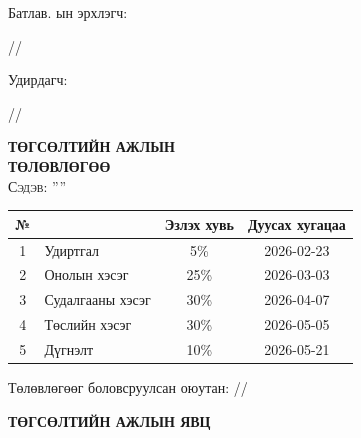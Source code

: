 
\begin{titlepage}

\vspace*{0.5cm}
Батлав. \deptname ын эрхлэгч: 
\begin{flushright}
\makebox[4cm]{\dotfill} /\chairname/ 
\end{flushright}

Удирдагч: 
\begin{flushright}
\makebox[4cm]{\dotfill} /\supname/
\end{flushright}

\begin{center}

\vspace*{2cm}
\textbf{{\large ТӨГСӨЛТИЙН АЖЛЫН \\ ТӨЛӨВЛӨГӨӨ}}\\[0.5cm]

\textsc{\large Сэдэв: ''\ttitle''}\\[0.5cm]

\begin{tabular}{|c|p{7cm}|c|c|}
	\hline
	№ & \makebox[7cm][c]{Ажлын бүлэг, хэсгийн нэр} & Эзлэх хувь & Дуусах хугацаа \\ \hline
	1 & {Удиртгал}         &  5\% & 2026-02-23 \\ \hline
	2 & {Онолын хэсэг}     & 25\% & 2026-03-03 \\ \hline
	3 & {Судалгааны хэсэг} & 30\% & 2026-04-07 \\ \hline
	4 & {Төслийн хэсэг}    & 30\% & 2026-05-05 \\ \hline
	5 & {Дүгнэлт}          & 10\% & 2026-05-21 \\ \hline
\end{tabular}

\vspace{2cm}
Төлөвлөгөөг боловсруулсан оюутан: \makebox[3cm]{\dotfill} /\shortname/

\end{center}

\newpage

\begin{center}

\vspace*{2cm}
\textbf{{\large ТӨГСӨЛТИЙН АЖЛЫН ЯВЦ}}\\[0.5cm]


\end{center}
\end{titlepage}
